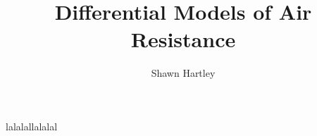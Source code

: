 \documentclass[12pt,letterpaper]{report}
\author{Shawn Hartley}
\title{Differential Models of Air Resistance}
\begin{document}
lalalallalalal
\end{document}
